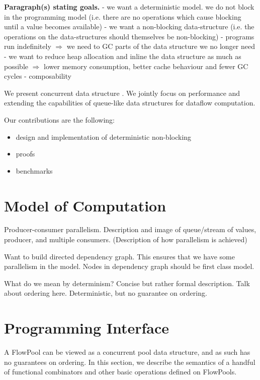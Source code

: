 \documentclass[runningheads,a4paper]{llncs}
\begin{document}
\textbf{Paragraph(s) stating goals.} 
- we want a deterministic model. we do not block in the programming model (i.e. there are no
operations which cause blocking until a value becomes available)
- we want a non-blocking data-structure (i.e. the operations on the
data-structures should themselves be non-blocking)
- programs run indefinitely $\Rightarrow$ we need to GC parts of the
data structure we no longer need
- we want to reduce heap allocation and inline the data structure as
much as possible $\Rightarrow$ lower memory consumption, better cache behaviour
and fewer GC cycles
- composability

We present concurrent data structure . We jointly focus on performance and
extending the capabilities of queue-like data structures for dataflow
computation.

Our contributions are the following:
\begin{itemize}
\item design and implementation of deterministic non-blocking 
\item proofs
\item benchmarks
\end{itemize}



\section{Model of Computation}

Producer-consumer parallelism. Description and image of queue/stream of
values, producer, and multiple consumers. (Description of how parallelism is
achieved)

Want to build directed dependency graph. This ensures that we have some parallelism in the model. 
Nodes in dependency graph should be first class model.

What do we mean by determinism? Concise but rather formal description.
Talk about ordering here. Deterministic, but no guarantee on ordering.

\section{Programming Interface}
\label{sec:programming-interface}

A FlowPool can be viewed as a concurrent pool data structure, and as such has
no guarantees on ordering. In this section, we describe the semantics of a
handful of functional combinators and other basic operations defined on
FlowPools.
\end{document}
